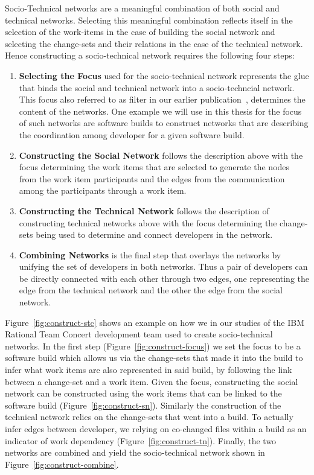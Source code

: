 Socio-Technical networks are a meaningful combination of both social and technical networks.
Selecting this meaningful combination reflects itself in the selection of the work-items in the case of building the social network and selecting the change-sets and their relations in the case of the technical network.
Hence constructing a socio-technical network requires the following four steps:

\begin{enumerate}
\item\textbf{Selecting the Focus} used for the socio-technical network represents the glue that binds the social and technical network into a socio-techncial network. 
This focus also referred to as filter in our earlier publication~\cite{}, determines the content of the networks.
One example we will use in this thesis for the focus of such networks are software builds to construct networks that are describing the coordination among developer for a given software build.
\item\textbf{Constructing the Social Network} follows the description above with the focus determining the work items that are selected to generate the nodes from the work item participants and the edges from the communication among the participants through a work item.
\item\textbf{Constructing the Technical Network} follows the description of constructing technical networks above with the focus determining the change-sets being used to determine and connect developers in the network.
\item\textbf{Combining Networks} is the final step that overlays the networks by unifying the set of developers in both networks.
Thus a pair of developers can be directly connected with each other through two edges, one representing the edge from the technical network and the other the edge from the social network.
\end{enumerate}

Figure~\ref{fig:construct-stc} shows an example on how we in our studies of the IBM Rational Team Concert development team used to create socio-technical networks.
In the first step (Figure~\ref{fig:construct-focus}) we set the focus to be a software build which allows us via the change-sets that made it into the build to infer what work items are also represented in said build, by following the link between a change-set and a work item.
Given the focus, constructing the social network can be constructed using the work items that can be linked to the software build (Figure~\ref{fig:construct-sn}).
Similarly the construction of the technical network relies on the change-sets that went into a build. 
To actually infer edges between developer, we relying on co-changed files within a build as an indicator of work dependency (Figure~\ref{fig:construct-tn}).
Finally, the two networks are combined and yield the socio-technical network shown in Figure~\ref{fig:construct-combine}.

